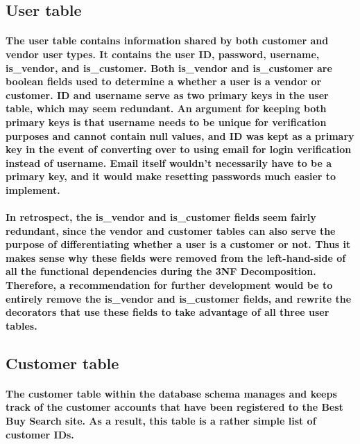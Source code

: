 \documentclass[sigconf]{acmart}
\begin{document}
\subsection{User table}

\paragraph{The user table contains information shared by both customer and vendor user types. It contains the user ID, password, username, is\_vendor, and is\_customer. Both is\_vendor and is\_customer are boolean fields used to determine a whether a user is a vendor or customer. ID and username serve as two primary keys in the user table, which may seem redundant. An argument for keeping both primary keys is that username needs to be unique for verification purposes and cannot contain null values, and ID was kept as a primary key in the event of converting over to using email for login verification instead of username. Email itself wouldn't necessarily have to be a primary key, and it would make resetting passwords much easier to implement.}     

\paragraph{In retrospect, the is\_vendor and is\_customer fields seem fairly redundant, since the vendor and customer tables can also serve the purpose of differentiating whether a user is a customer or not. Thus it makes sense why these fields were removed from the left-hand-side of all the functional dependencies during the 3NF Decomposition. Therefore, a recommendation for further development would be to entirely remove the is\_vendor and is\_customer fields, and rewrite the decorators that use these fields to take advantage of all three user tables. }

\subsection{Customer table}

\paragraph{The customer table within the database schema manages and keeps track of the customer accounts that have been registered to the Best Buy Search site. As a result, this table is a rather simple list of customer IDs. }
\end{document}

